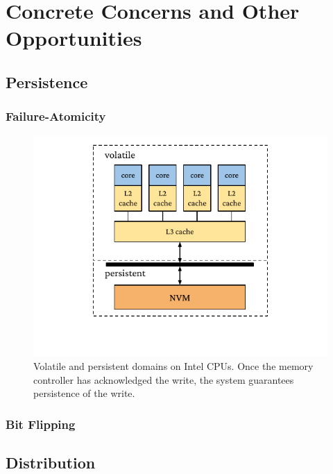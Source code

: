 
\chapter[Concrete Concerns and Other Opportunities]{Concrete Concerns and \linebreak Other Opportunities}\label{ch:concrete}

\section{Persistence}

\subsection{Failure-Atomicity}

\begin{figure}
    \centering
    \includegraphics[width=\linewidth]{fig/vpdomains.pdf}
    \caption{Volatile and persistent domains on Intel CPUs. Once the memory controller has acknowledged the write, the system guarantees persistence of the write.}
    \label{fig:vpdomains}
\end{figure}
\subsection{Bit Flipping}

\section{Distribution}

